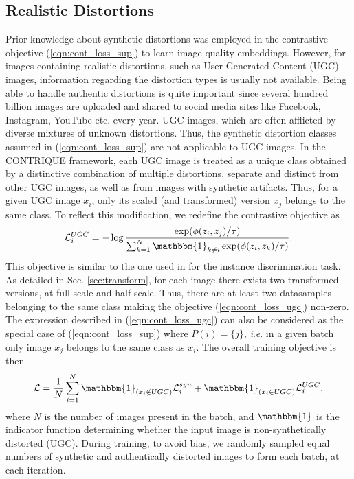 \documentclass[journal]{IEEEtran}
\newcommand{\ie}{\textit{i}.\textit{e}.}
\begin{document}
\subsection{Realistic Distortions}
Prior knowledge about synthetic distortions was employed in the contrastive objective (\ref{eqn:cont_loss_sup}) to learn image quality embeddings. However, for images containing realistic distortions, such as User Generated Content (UGC) images, information regarding the distortion types is usually not available. Being able to handle authentic distortions is quite important since several hundred billion images are uploaded and shared to social media sites like Facebook, Instagram, YouTube etc. every year. UGC images, which are often afflicted by diverse mixtures of unknown distortions. Thus, the synthetic distortion classes assumed in (\ref{eqn:cont_loss_sup}) are not applicable to UGC images. In the CONTRIQUE framework, each UGC image is treated as a unique class obtained by a distinctive combination of multiple distortions, separate and distinct from other UGC images, as well as from images with synthetic artifacts. Thus, for a given UGC image $x_i$, only its scaled (and transformed) version $x_j$ belongs to the same class. To reflect this modification, we redefine the contrastive objective as 
\begin{align}
    \mathcal{L}_i ^{UGC} =  -\log \frac{\exp(\phi(z_i,z_j)/\tau)}{\sum_{k=1}^N \mathbbm{1}_{k \neq i}\exp(\phi(z_i,z_k)/\tau)}.
    \label{eqn:cont_loss_ugc}
\end{align}
This objective is similar to the one used in \cite{chen2020simple,he2020momentum} for the instance discrimination task. As detailed in Sec. \ref{sec:transform}, for each image there exists two transformed versions, at full-scale and half-scale. Thus, there are at least two datasamples belonging to the same class making the objective (\ref{eqn:cont_loss_ugc}) non-zero. The expression described in (\ref{eqn:cont_loss_ugc}) can also be considered as the special case of (\ref{eqn:cont_loss_sup}) where $P(i) = \{j\}$, \ie{} in a given batch only image $x_j$ belongs to the same class as $x_i$. The overall training objective is then
\begin{align}
    \mathcal{L} = \frac{1}{N} \sum_{i = 1} ^N \mathbbm{1}_{(x_i \notin UGC)} \mathcal{L}_i ^{syn} + \mathbbm{1}_{(x_i \in UGC)}\mathcal{L}_i ^{UGC},
    \label{eqn:cont_loss_total}
\end{align}
where $N$ is the number of images present in the batch, and $\mathbbm{1}$ is the indicator function determining whether the input image is non-synthetically distorted (UGC). During training, to avoid bias, we randomly sampled equal numbers of synthetic and authentically distorted images to form each batch, at each iteration.
\end{document}
